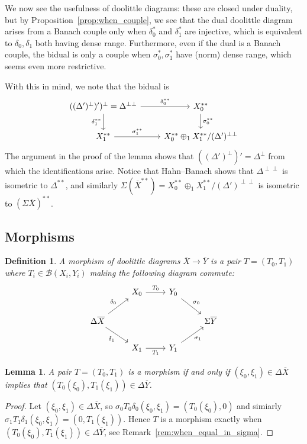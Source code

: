 \documentclass[a4paper,11pt]{article}
\theoremstyle{plain}
\newtheorem{lemma}[proposition]{Lemma}
\newtheorem{definition}[proposition]{Definition}
\theoremstyle{remark}
\newcommand{\mc}[1]{\mathcal{#1}}
\begin{document}
We now see the usefulness of doolittle diagrams: these are closed under duality, but by Proposition~\ref{prop:when_couple}, we see that the dual doolittle diagram arises from a Banach couple only when $\delta_0^*$ and $\delta_1^*$ are injective, which is equivalent to $\delta_0,\delta_1$ both having dense range.  Furthermore, even if the dual is a Banach couple, the bidual is only a couple when $\sigma_0^*, \sigma_1^*$ have (norm) dense range, which seems even more restrictive.

With this in mind, we note that the bidual is
\[ \begin{tikzcd}
  ((\Delta')^\perp)')^\perp = \Delta^{\perp\perp} \arrow[r, "\delta_0^{**}"] \arrow[d, "\delta_1^{**}"'] & X_0^{**} \arrow[d, "\sigma_0^{**}"]\\
  X_1^{**} \arrow[r, "\sigma_1^{**}"] & X_0^{**} \oplus_1 X_1^{**} / (\Delta')^{\perp\perp}
\end{tikzcd} \]
The argument in the proof of the lemma shows that $((\Delta')^\perp)' = \Delta^\perp$ from which the identifications arise.  Notice that Hahn--Banach shows that $\Delta^{\perp\perp}$ is isometric to $\Delta^{**}$, and similarly $\Sigma(\overline X^{**}) = X_0^{**} \oplus_1 X_1^{**} / (\Delta')^{\perp\perp}$ is isometric to $(\Sigma\overline X)^{**}$.


\subsection{Morphisms}

\begin{definition}
A morphism of doolittle diagrams $\overline X \to \overline Y$ is a pair $T=(T_0, T_1)$ where $T_i\in\mc B(X_i, Y_i)$ making the following diagram commute:
\[ \begin{tikzcd} & X_0 \arrow[r, "T_0"] & Y_0 \arrow[rd, "\sigma_0"] \\
\Delta\overline X \arrow[ru, "\delta_0"] \arrow[rd, "\delta_1"'] & & &  \Sigma\overline Y \\
& X_1 \arrow[r, "T_1"'] & Y_1 \arrow[ru, "\sigma_1"'] \end{tikzcd} \]
\end{definition}

\begin{lemma}\label{lem:when_morphism}
A pair $T=(T_0,T_1)$ is a morphism if and only if $(\xi_0,\xi_1)\in\Delta\overline X$ implies that $(T_0(\xi_0), T_1(\xi_1)) \in \Delta\overline Y$.
\end{lemma}
\begin{proof}
Let $(\xi_0,\xi_1)\in\Delta\overline X$, so $\sigma_0 T_0 \delta_0(\xi_0,\xi_1) = (T_0(\xi_0), 0)$ and simiarly $\sigma_1 T_1 \delta_1(\xi_0,\xi_1) = (0, T_1(\xi_1))$.  Hence $T$ is a morphism exactly when $(T_0(\xi_0), T_1(\xi_1)) \in \Delta\overline Y$, see Remark~\ref{rem:when_equal_in_sigma}.
\end{proof}
\end{document}
